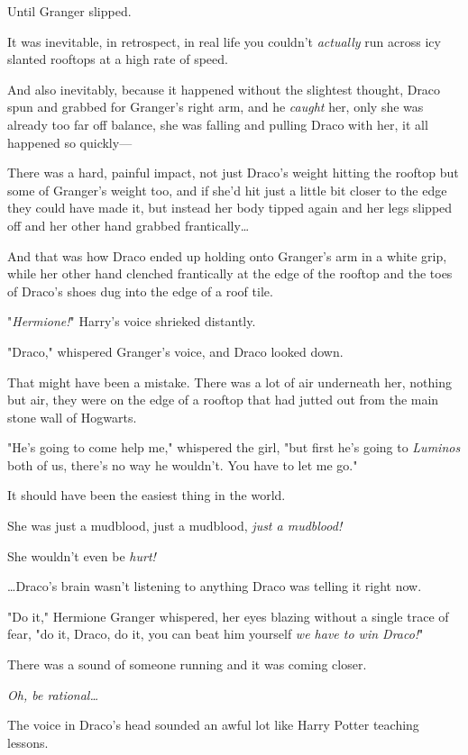 Until Granger slipped.

It was inevitable, in retrospect, in real life you couldn't \emph{actually} run 
across icy slanted rooftops at a high rate of speed.

And also inevitably, because it happened without the slightest thought, Draco 
spun and grabbed for Granger's right arm, and he \emph{caught} her, only she 
was already too far off balance, she was falling and pulling Draco with her, it 
all happened so quickly---

There was a hard, painful impact, not just Draco's weight hitting the rooftop 
but some of Granger's weight too, and if she'd hit just a little bit closer to 
the edge they could have made it, but instead her body tipped again and her 
legs slipped off and her other hand grabbed frantically{\ldots}

And that was how Draco ended up holding onto Granger's arm in a white grip, 
while her other hand clenched frantically at the edge of the rooftop and the 
toes of Draco's shoes dug into the edge of a roof tile.

"\emph{Hermione!}" Harry's voice shrieked distantly.

"Draco," whispered Granger's voice, and Draco looked down.

That might have been a mistake. There was a lot of air underneath her, nothing 
but air, they were on the edge of a rooftop that had jutted out from the main 
stone wall of Hogwarts.

"He's going to come help me," whispered the girl, "but first he's going to 
\emph{Luminos} both of us, there's no way he wouldn't. You have to let me go."

It should have been the easiest thing in the world.

She was just a mudblood, just a mudblood, \emph{just a mudblood!}

She wouldn't even be \emph{hurt!}

{\ldots}Draco's brain wasn't listening to anything Draco was telling it right 
now.

"Do it," Hermione Granger whispered, her eyes blazing without a single trace of 
fear, "do it, Draco, do it, you can beat him yourself \emph{we have to win 
Draco!}"

There was a sound of someone running and it was coming closer.

\emph{Oh, be rational{\ldots}}

The voice in Draco's head sounded an awful lot like Harry Potter teaching 
lessons.

